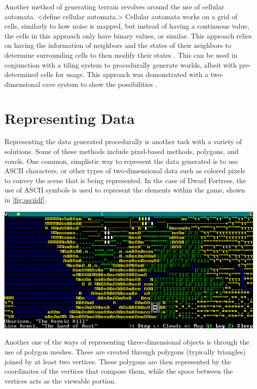 \documentclass[10pt]{report}
\begin{document}
		Another method of generating terrain revolves around the use of cellular automata. <define cellular automata.> Cellular automata works on a grid of cells, similarly to how noise is mapped, but instead of having a continuous value, the cells in this approach only have binary values, or similar. This approach relies on having the information of neighbors and the states of their neighbors to determine surrounding cells to then modify their states \cite{nature-of-code}. This can be used in conjunction with a tiling system to procedurally generate worlds, albeit with pre-determined cells for usage. This approach was demonstrated with a two-dimensional cave system to show the possibilities \cite{10.1145/1814256.1814266}.
		
		\section{Representing Data}
	
		Representing the data generated procedurally is another task with a variety of solutions. Some of these methods include pixel-based methods, polygons, and voxels. One common, simplistic way to represent the data generated is to use ASCII characters, or other types of two-dimensional data such as colored pixels to convey the scene that is being represented. In the case of Dwarf Fortress, the use of ASCII symbols is used to represent the elements within the game, shown in \autoref{fig:asciidf}.
		
		\begin{minipage}{\textwidth}
			\centering
			\includegraphics[scale=.5]{dwarf_fortress}
			\label{fig:asciidf}
		\end{minipage}
		
		Another one of the ways of representing three-dimensional objects is through the use of polygon meshes. These are created through polygons (typically triangles) joined by at least two vertices. These polygons are then represented by the coordinates of the vertices that compose them, while the space between the vertices acts as the viewable portion.
		
\end{document}
